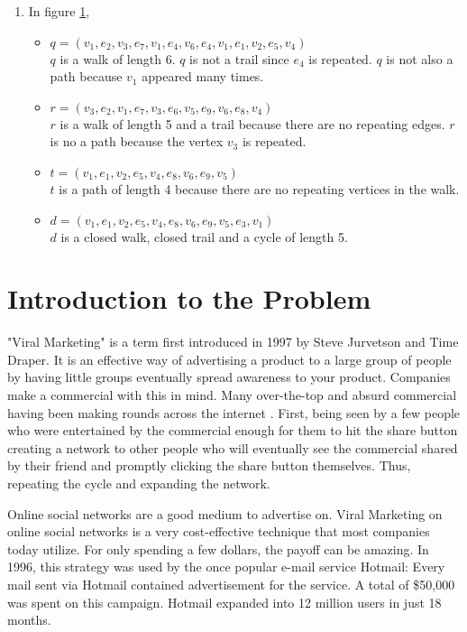 \begin{enumerate}
\begin{figure}[h]
\label{walkfig}
\end{figure}
\item[] In figure \ref{walkfig},
\begin{itemize}
\item $q=(v_1,e_2,v_3,e_7,v_1,e_4,v_6,e_4,v_1,e_1,v_2,e_5,v_4)$\\ $q$ is a walk of length 6. $q$ is not a trail since $e_4$ is repeated. $q$ is not also a path because $v_1$ appeared many times.
\item $r=(v_3,e_2,v_1,e_7,v_3,e_6,v_5,e_9,v_6,e_8,v_4)$ \\ $r$ is a walk of length 5 and a trail because there are no repeating edges. $r$ is no a path because the vertex $v_3$ is repeated.
\item $t=(v_1,e_1,v_2,e_5,v_4,e_8,v_6,e_9,v_5)$ \\ $t$ is a path of length 4 because there are no repeating vertices in the walk.
\item $d=(v_1,e_1,v_2,e_5,v_4,e_8,v_6,e_9,v_5,e_3,v_1)$ \\ $d$ is a closed walk, closed trail and a cycle of length 5.
\end{itemize}

\end{enumerate}

\section{Introduction to the Problem}"Viral Marketing" is a term first introduced in 1997 by Steve Jurvetson and Time Draper\cite{viralmarketing}. It is an effective way of advertising a product to a large group of people by having little groups eventually spread awareness to your product. Companies make a commercial with this in mind. Many over-the-top and absurd commercial having been making rounds across the internet \cite{commercialrise}. First, being seen by a few people who were entertained by the commercial enough for them to hit the share button creating a network to other people who will eventually see the commercial shared by their friend and promptly clicking the share button themselves. Thus, repeating the cycle and expanding the network. 

Online social networks are a good medium to advertise on. Viral Marketing on online social networks is a very cost-effective technique that most companies today utilize. For only spending a few dollars, the payoff can be amazing.\cite{viralmarketing} In 1996, this strategy was used by the once popular e-mail service Hotmail: Every mail sent via Hotmail contained advertisement for the service. A total of \$50,000 was spent on this campaign. Hotmail expanded into 12 million users in just 18 months.\cite{viralmarketing} 

